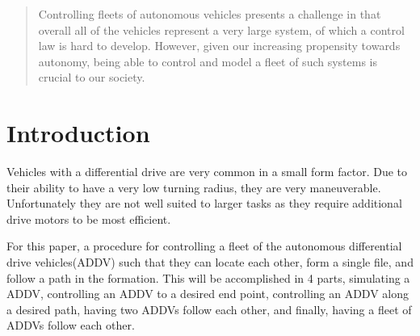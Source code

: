 \documentclass[journal]{IEEEtran}
\begin{document}




\maketitle


\begin{abstract}
Controlling fleets of autonomous vehicles presents a challenge in that 
overall all of the vehicles represent a very large system, of which a
control law is hard to develop. However, given our increasing propensity
towards autonomy, being able to control and model a fleet of such systems
is crucial to our society.
\end{abstract}







%
\IEEEpeerreviewmaketitle



\section{Introduction}
Vehicles with a differential drive are very common in a small form factor. 
Due to their ability to have a very low turning radius, they are very maneuverable.
Unfortunately they are not well suited to larger tasks as they require additional
drive motors to be most efficient. 

For this paper, a procedure for controlling a fleet of the
autonomous differential drive vehicles(ADDV) such that they can
locate each other, form a single file, and follow a path in the formation. 
This will be accomplished in 4 parts, simulating a ADDV, controlling 
an ADDV to a desired end point, controlling an ADDV along a desired path, 
having two ADDVs follow each other, and finally, having a fleet of ADDVs follow each other. 
\end{document}

